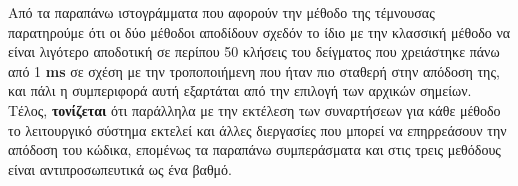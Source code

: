 \documentclass[First Project.tex]{subfiles}
\begin{document}
\vspace{5mm}
\begin{figure}[h!]
    \centering
    \quad
\end{figure}

Από τα παραπάνω ιστογράμματα που αφορούν την μέθοδο της τέμνουσας παρατηρούμε ότι οι δύο μέθοδοι αποδίδουν σχεδόν το ίδιο με την κλασσική
μέθοδο να είναι λιγότερο αποδοτική σε περίπου 50 κλήσεις του δείγματος που χρειάστηκε πάνω από 1 \textlatin{\textbf{ms}} σε σχέση 
με την τροποποιήμενη που ήταν πιο σταθερή στην απόδοση της, και πάλι η συμπεριφορά αυτή εξαρτάται από την επιλογή των αρχικών σημείων. Τέλος,
\textbf{τονίζεται} ότι παράλληλα με την εκτέλεση των συναρτήσεων για κάθε μέθοδο το λειτουργικό σύστημα εκτελεί και άλλες διεργασίες που 
μπορεί να επηρρεάσουν την απόδοση του κώδικα, επομένως τα παραπάνω συμπεράσματα και στις τρεις μεθόδους είναι αντιπροσωπευτικά ως ένα βαθμό.
\newpage
\end{document}
